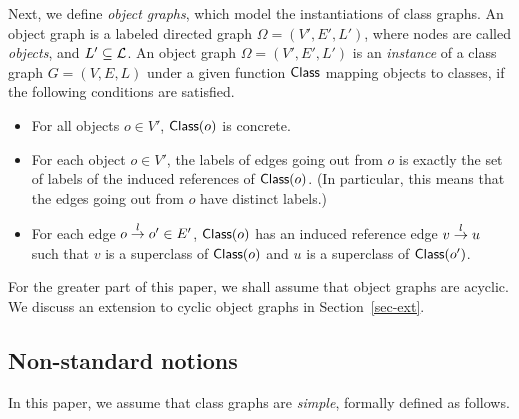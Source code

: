 Next, we define {\em object graphs}, which model the instantiations of
class graphs.  An object graph is a labeled directed graph
$\Omega=(V',E',L')$, where nodes are called {\em objects}, and
$L'\subseteq{\cal L}$.  An object graph $\Omega=(V',E',L')$ is an {\em
instance} of a class graph $G=(V,E,L)$ under a given function $\mbox{\sf Class}$
mapping objects to classes, if the following conditions are satisfied.
\begin{itemize}
\item For all objects $o\in V'$, $\mbox{\sf Class}(o)$ is concrete.
\item For each object $o\in V'$, the labels of edges going out from
      $o$ is exactly the set of labels of the induced references of
      $\mbox{\sf Class}(o)$. (In particular, this means that the edges going out
      from $o$ have distinct labels.)
\item For each edge $o\stackrel{l}{\rightarrow}o'\in E'$, $\mbox{\sf Class}(o)$ has an induced
      reference edge $v\stackrel{l}{\rightarrow}u$ such that $v$ is a superclass of
      $\mbox{\sf Class}(o)$ and $u$  is a superclass of $\mbox{\sf Class}(o')$.
\end{itemize}
For the greater part of this paper, we shall assume that object graphs
are acyclic. We discuss an extension to cyclic object graphs in
Section~\ref{sec-ext}.

\subsection{Non-standard notions}
\label{ssec-assumptions}

In this paper, we assume that class graphs are {\em simple}, formally
defined as follows.

